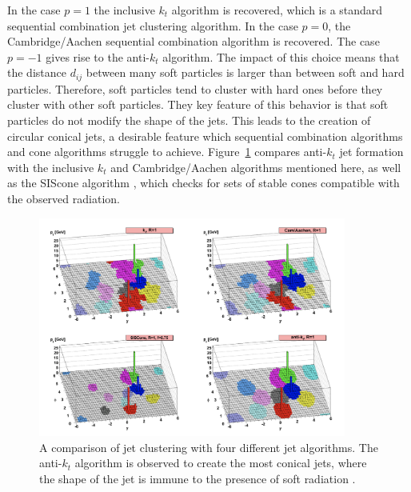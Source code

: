 In the case $p=1$ the inclusive $k_t$ algorithm \cite{seq_comb_alg} is recovered, which is a standard sequential combination jet clustering algorithm. In the case $p=0$, the Cambridge/Aachen sequential combination algorithm \cite{aachen} is recovered. The case $p=-1$ gives rise to the anti-$k_t$ algorithm. The impact of this choice means that the distance $d_{ij}$ between many soft particles is larger than between soft and hard particles. Therefore, soft particles tend to cluster with hard ones before they cluster with other soft particles. They key feature of this behavior is that soft particles do not modify the shape of the jets. This leads to the creation of circular conical jets, a desirable feature which sequential combination algorithms and cone algorithms struggle to achieve. Figure~\ref{fig:jet_algorithms} compares anti-$k_t$ jet formation with the inclusive $k_t$ and Cambridge/Aachen algorithms mentioned here, as well as the SIScone algorithm \cite{siscone}, which checks for sets of stable cones compatible with the observed radiation. \par

\begin{figure}[h]
        \centering
	\includegraphics[width=0.9\textwidth]{figures/ch5/jet_algorithms}
	\caption{ A comparison of jet clustering with four different jet algorithms. The anti-$k_t$ algorithm is observed to create the most conical jets, where the shape of the jet is immune to the presence of soft radiation \cite{anti_kt}. }
	\label{fig:jet_algorithms}
\end{figure}

